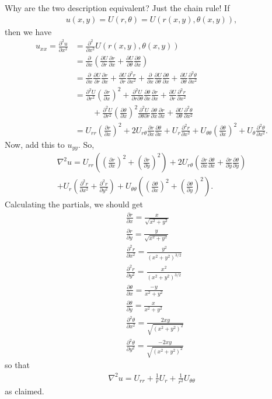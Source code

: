 \documentclass{article}
\theoremstyle{definition}
\newcommand{\p}{\partial}
\newcommand{\f}[2]{\frac{#1}{#2}}
\newcommand{\lp}{\left(}
\newcommand{\rp}{\right)}
\begin{document}
Why are the two description equivalent? Just the chain rule! If
\begin{align*}
u(x,y) = U(r,\theta) = U(r(x,y), \theta(x,y)),
\end{align*}
then we have
\begin{align*}
u_{xx} = \f{\p^2 u}{\p x^2} &= \f{\p^2}{\p x^2}U(r(x,y), \theta(x,y))\\
&= \f{\p}{\p x}\left( \f{\p U}{\p r}\f{\p r}{\p x} +  \f{\p U}{\p \theta}\f{\p \theta}{\p x} \right)\\
&= \f{\p}{\p x}\f{\p U}{\p r}\f{\p r}{\p x} + \f{\p U}{\p r}\f{\p^2 r}{\p x^2} + \f{\p }{\p x}\f{\p U}{\p \theta}\f{\p \theta}{\p x} + \f{\p U}{\p \theta}\f{\p^2 \theta}{\p x^2}\\
&= \f{\p^2 U}{\p r^2}\left(\f{\p r}{\p x}\right)^2 + \f{\p^2 U}{\p r \p \theta}\f{\p \theta}{\p x}\f{\p r}{\p x} + \f{\p U}{\p r}\f{\p^2 r}{\p x^2} \\
&\,\,\,\,\,\,\,\,\,\,\,\,\,+  \f{\p^2 U}{\p r^2}\left(\f{\p \theta}{\p x}\right)^2 \f{\p^2 U}{\p \theta \p r}\f{\p \theta}{\p x}\f{\p r}{\p x} + \f{\p U}{\p \theta}\f{\p^2 \theta}{\p x^2}\\
&= U_{rr}\lp\f{\p r}{\p x}\rp^2 + 2U_{r\theta} \f{\p r}{\p x} \f{\p \theta}{\p x} + U_r \f{\p^2 r}{\p x^2} + U_{\theta\theta} \lp \f{\p \theta}{\p x}\rp^2 + U_\theta \f{\p^2 \theta}{\p x^2}.
\end{align*}
Now, add this to $u_{yy}$. So,
\begin{align*}
\nabla^2 u = U_{rr} \lp \lp \f{\p r}{\p x} \rp^2 + \lp \f{\p r}{\p y} \rp^2 \rp+ 2U_{r\theta} \lp \f{\p r}{\p x}\f{\p \theta}{\p x}  +  
\f{\p r}{\p y}\f{\p \theta}{\p y} \rp \\
+ U_r\lp\f{\p^2 r}{\p x^2} + \f{\p^2 r}{\p y^2} \rp + U_{\theta\theta} \lp \lp \f{\p\theta}{\p x} \rp^2 +  \lp\f{\p\theta}{\p y} \rp^2\rp.
\end{align*}
Calculating the partials, we should get
\begin{align*}
&\f{\p r}{\p x} = \f{x}{\sqrt{x^2 +y^2}}\\
&\f{\p r}{\p y} = \f{y}{\sqrt{x^2 +y^2}}\\
&\f{\p^2 r}{\p x^2} = \f{y^2}{(x^2+y^2)^{3/2}}\\
&\f{\p^2 r}{\p y^2} = \f{x^2}{(x^2+y^2)^{3/2}}\\
&\f{\p \theta}{\p x} = \f{-y}{x^2+y^2}\\
&\f{\p \theta}{\p y} = \f{x}{x^2+y^2}\\
&\f{\p^2 \theta}{\p x^2} = \f{2xy}{\sqrt{(x^2+y^2)^2}}\\
&\f{\p^2 \theta}{\p y^2} = \f{-2xy}{\sqrt{(x^2+y^2)^2}}
\end{align*}
so that
\begin{align*}
\nabla^2 u = U_{rr} + \f{1}{r}U_r + \f{1}{r^2}U_{\theta\theta}
\end{align*}
as claimed. \\
\end{document}
